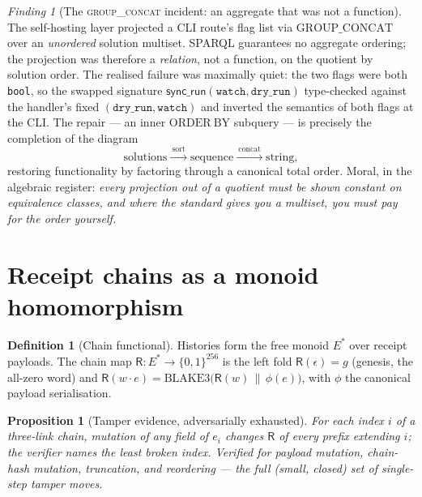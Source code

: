 \documentclass[11pt,a4paper]{report}
\newtheorem{proposition}[theorem]{Proposition}
\theoremstyle{definition}
\newtheorem{definition}[theorem]{Definition}
\theoremstyle{remark}
\newtheorem{finding}[theorem]{Finding}
\newcommand{\rec}{\mathsf{R}}
\begin{document}
\begin{finding}[The \textsc{group\_concat} incident: an aggregate that was
not a function]\label{find:gc}
The self-hosting layer projected a CLI route's flag list via
$\mathrm{GROUP\_CONCAT}$ over an \emph{unordered} solution multiset. SPARQL
guarantees no aggregate ordering; the projection was therefore a
\emph{relation}, not a function, on the quotient by solution order. The
realised failure was maximally quiet: the two flags were both \texttt{bool},
so the swapped signature
$\mathsf{sync\_run}(\mathtt{watch}, \mathtt{dry\_run})$ type-checked against
the handler's fixed $(\mathtt{dry\_run}, \mathtt{watch})$ and inverted the
semantics of both flags at the CLI. The repair --- an inner
$\mathrm{ORDER\ BY}$ subquery --- is precisely the completion of the diagram
\[
  \text{solutions} \xrightarrow{\ \mathrm{sort}\ }
  \text{sequence} \xrightarrow{\ \mathrm{concat}\ } \text{string},
\]
restoring functionality by factoring through a canonical total order. Moral,
in the algebraic register: \emph{every projection out of a quotient must be
shown constant on equivalence classes, and where the standard gives you a
multiset, you must pay for the order yourself.}
\end{finding}

\section{Receipt chains as a monoid homomorphism}

\begin{definition}[Chain functional]
Histories form the free monoid $E^{*}$ over receipt payloads. The chain map
$\rec : E^{*} \to \{0,1\}^{256}$ is the left fold
$\rec(\epsilon) = g$ (genesis, the all-zero word) and
$\rec(w\!\cdot\!e) = \mathrm{BLAKE3}\bigl(\rec(w) \,\|\, \phi(e)\bigr)$,
with $\phi$ the canonical payload serialisation.
\end{definition}

\begin{proposition}[Tamper evidence, adversarially exhausted]
For each index $i$ of a three-link chain, mutation of any field of $e_i$
changes $\rec$ of every prefix extending $i$; the verifier names the least
broken index. Verified for payload mutation, chain-hash mutation,
truncation, and reordering --- the full (small, closed) set of single-step
tamper moves.
\end{proposition}

\end{document}
